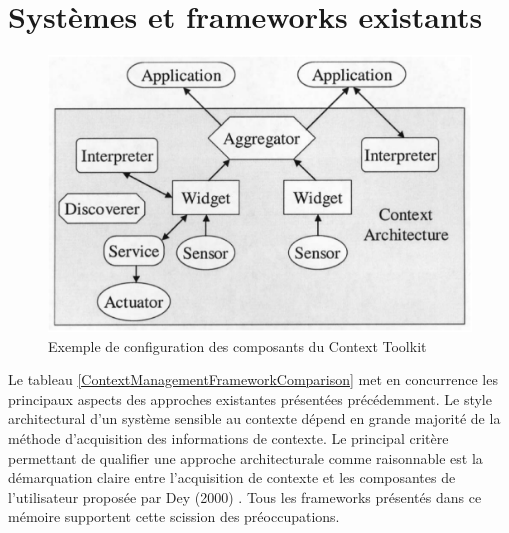 \section{Systèmes et frameworks existants}

\begin{figure}[H]
    \centerline{\includegraphics[width=.37\textwidth]{img/context_toolkit}}
    \caption{Exemple de configuration des composants du Context Toolkit}
    \label{Contexttoolkit}
\end{figure}

Le tableau \ref{ContextManagementFrameworkComparison} met en concurrence les
principaux aspects des approches existantes présentées précédemment. Le style
architectural d'un système sensible au contexte dépend en grande majorité de la
méthode d'acquisition des informations de contexte. Le principal critère
permettant de qualifier une approche architecturale comme raisonnable est la
démarquation claire entre l'acquisition de contexte et les composantes de
l'utilisateur proposée par Dey (2000) \cite{dey_providing_2000}. Tous les
frameworks présentés dans ce mémoire supportent cette scission des
préoccupations.

